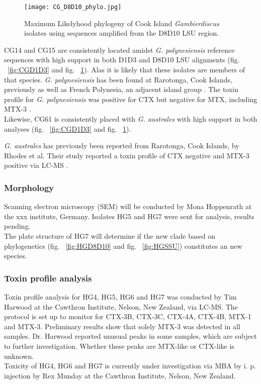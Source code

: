 \documentclass[12pt]{article}
\begin{document}
\begin{figure} 
\texttt{[image: CG\_D8D10\_phylo.jpg]} 
\caption{Maximum Likelyhood phylogeny of Cook Island \textit{Gambierdiscus} isolates using sequences amplified from the D8D10 LSU region.} 
\label{fig:CGD8D0}
\end{figure} 
\FloatBarrier 

CG14 and CG15 are consistently located amidst \emph{G. polynesiensis} reference sequences with high support in both D1D3 and D8D10 LSU alignments (fig. ~\ref{fig:CGD1D3} and fig. ~\ref{fig:CGD8D0}). Alas it is likely that these isolates are members of that species.
\emph{G. polynesiensis} has been found at Rarotonga, Cook Islands, previously \cite{rhodes2014production} as well as French Polynesia, an adjacent island group \cite{chinain1999morphology}. The toxin profile for \emph{G. polynesiensis} was positive for CTX \cite{chinain2010growth,rhodes2014production} but negative for MTX, including MTX-3 \cite{rhodes2014production}.
\\
Likewise, CG61 is consistently placed with \emph{G. australes} with high support in both analyses (fig. ~\ref{fig:CGD1D3} and fig. ~\ref{fig:CGD8D0}).

\emph{G. australes} has previously been reported from Rarotonga, Cook Islands, by Rhodes et al. Their study reported a toxin profile of CTX negative and MTX-3 positive via LC-MS \cite{rhodes2014production}.

\subsubsection{Morphology}
Scanning electron microscopy (SEM) will be conducted by Mona Hoppenrath at the xxx institute, Germany. Isolates HG5 and HG7 were sent for analysis, results pending.\\
The plate structure of HG7 will determine if the new clade based on phylogenetics (fig. ~\ref{fig:HGD8D10} and fig. ~\ref{fig:HGSSU}) constitutes an new species.


\subsubsection{Toxin profile analysis}
Toxin profile analysis for HG4, HG5, HG6 and HG7 was conducted by Tim Harwood at the Cawthron Institute, Nelson, New Zealand, via LC-MS. The protocol is set up to monitor for CTX-3B, CTX-3C, CTX-4A, CTX-4B, MTX-1 and MTX-3. Preliminary results show that solely MTX-3 was detected in all samples. Dr. Harwood reported unusual peaks in some samples, which are subject to further investigation. Whether these peaks are MTX-like or CTX-like is unknown.\\
Toxicity of HG4, HG6 and HG7 is currently under investigation via MBA by i. p. injection by Rex Munday at the Cawthron Institute, Nelson, New Zealand.\\
\end{document}
